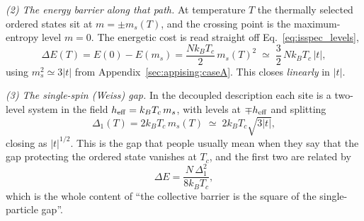 \documentclass[10pt,a4paper]{article}
\theoremstyle{remark}
\begin{document}
\emph{(2) The energy barrier along that path.} At temperature $T$ the thermally
selected ordered states sit at $m=\pm m_s(T)$, and the crossing point is the
maximum-entropy level $m=0$. The energetic cost is read straight off
Eq.~\eqref{eq:isspec_levels},
\begin{equation}\label{eq:isspec_dE}
\Delta E(T)=E(0)-E(m_s)=\frac{N k_BT_c}{2}\,m_s(T)^{2}
\;\simeq\;\frac{3}{2}\,N k_BT_c\,|t| ,
\end{equation}
using $m_s^{2}\simeq3|t|$ from Appendix~\ref{sec:appising:caseA}. This closes
\emph{linearly} in $|t|$.

\emph{(3) The single-spin (Weiss) gap.} In the decoupled description each site is
a two-level system in the field $h_{\rm eff}=k_BT_c\,m_s$, with levels at
$\mp h_{\rm eff}$ and splitting
\begin{equation}\label{eq:isspec_D1}
\Delta_1(T)=2k_BT_c\,m_s(T)\;\simeq\;2k_BT_c\sqrt{3|t|} ,
\end{equation}
closing as $|t|^{1/2}$. This is the gap that people usually mean when they say
that the gap protecting the ordered state vanishes at $T_c$, and the first two
are related by
\begin{equation}\label{eq:isspec_relation}
\Delta E=\frac{N\,\Delta_1^{2}}{8k_BT_c} ,
\end{equation}
which is the whole content of ``the collective barrier is the square of the
single-particle gap''.
\end{document}
